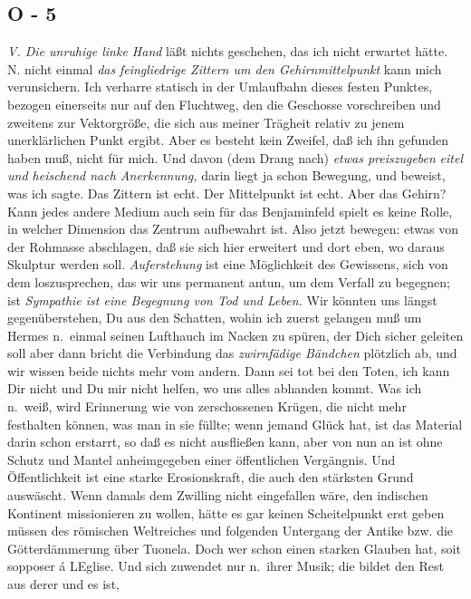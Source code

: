 \documentclass[
]{article}
\author{}
\date{\vspace{-2.5em}}
\begin{document}
\subsection{O - 5}\label{o---5}

\emph{V. Die unruhige linke Hand} läßt nichts geschehen, das ich nicht
erwartet hätte. N. nicht einmal \emph{das} \emph{feingliedrige Zittern
um den Gehirnmittelpunkt }kann mich verunsichern. Ich verharre statisch
in der Umlaufbahn dieses festen Punktes, bezogen einerseits nur auf den
Fluchtweg, den die Geschosse vorschreiben und zweitens zur Vektorgröße,
die sich aus meiner Trägheit relativ zu jenem unerklärlichen Punkt
ergibt. Aber es besteht kein Zweifel, daß ich ihn gefunden haben muß,
nicht für mich. Und davon (dem Drang nach) \emph{etwas preiszugeben}
\emph{eitel und heischend nach Anerkennung,} darin liegt ja schon
Bewegung, und beweist, was ich sagte. Das Zittern ist echt. Der
Mittelpunkt ist echt. Aber das Gehirn? Kann jedes andere Medium auch
sein für das Benjaminfeld spielt es keine Rolle, in welcher Dimension
das Zentrum aufbewahrt ist. Also jetzt bewegen: etwas von der Rohmasse
abschlagen, daß sie sich hier erweitert und dort eben, wo daraus
Skulptur werden soll. \emph{Auferstehung} ist eine Möglichkeit des
Gewissens, sich von dem loszusprechen, das wir uns permanent antun, um
dem Verfall zu begegnen; ist \emph{Sympathie ist eine Begegnung von Tod
und Leben.} Wir könnten uns längst gegenüberstehen, Du aus den Schatten,
wohin ich zuerst gelangen muß um Hermes\textquotesingle{} n.~einmal
seinen Lufthauch im Nacken zu spüren, der Dich sicher geleiten soll aber
dann bricht die Verbindung das \emph{zwirnfädige Bändchen} plötzlich ab,
und wir wissen beide nichts mehr vom andern. Dann sei tot bei den Toten,
ich kann Dir nicht und Du mir nicht helfen, wo uns alles abhanden kommt.
Was ich n.~weiß, wird Erinnerung wie von zerschossenen Krügen, die nicht
mehr festhalten können, was man in sie füllte; wenn jemand Glück hat,
ist das Material darin schon erstarrt, so daß es nicht ausfließen kann,
aber von nun an ist ohne Schutz und Mantel anheimgegeben einer
öffentlichen Vergängnis. Und Öffentlichkeit ist eine starke
Erosionskraft, die auch den stärksten Grund auswäscht. Wenn damals dem
Zwilling nicht eingefallen wäre, den indischen Kontinent missionieren zu
wollen, hätte es gar keinen Scheitelpunkt erst geben müssen des
römischen Weltreiches und folgenden Untergang der Antike bzw. die
Götterdämmerung über Tuonela. Doch wer schon einen starken Glauben hat,
soit s\textquotesingle opposer á L\textquotesingle Eglise. Und sich
zuwendet nur n.~ihrer Musik; die bildet den Rest aus derer und es ist,
\end{document}
